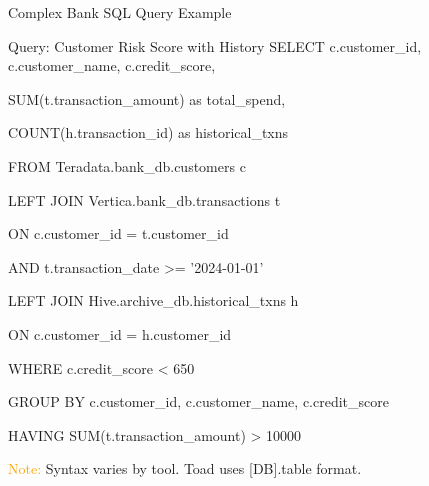 \documentclass{beamer}
\begin{document}
	
	\begin{frame}{Complex Bank SQL Query Example}
		\begin{block}{Query: Customer Risk Score with History}
			\small
			\color{blue}
			SELECT c.customer\_id, c.customer\_name, c.credit\_score,\par
			SUM(t.transaction\_amount) as total\_spend,\par
			COUNT(h.transaction\_id) as historical\_txns\par
			FROM Teradata.bank\_db.customers c\par
			LEFT JOIN Vertica.bank\_db.transactions t\par
			ON c.customer\_id = t.customer\_id\par
			AND t.transaction\_date >= '2024-01-01'\par
			LEFT JOIN Hive.archive\_db.historical\_txns h\par
			ON c.customer\_id = h.customer\_id\par
			WHERE c.credit\_score < 650\par
			GROUP BY c.customer\_id, c.customer\_name, c.credit\_score\par
			HAVING SUM(t.transaction\_amount) > 10000
			\color{black}
		\end{block}
		
		\begin{center}
			\textcolor{orange}{Note:} Syntax varies by tool. Toad uses [DB].table format.
		\end{center}
	\end{frame}
	
\end{document}
